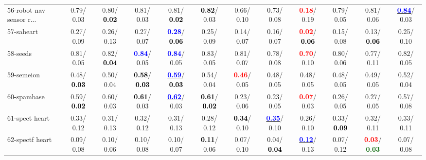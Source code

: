 \begin{table}[h]
\begin{center}
{\begin{tabular}{lc|c|c|c|c|c|c|c|c|c|c}
56-robot nav sensor r... &   0.79/  0.03 &   0.80/\textcolor{black}{\textbf{  0.02}} &   0.81/  0.03 &   0.81/\textcolor{black}{\textbf{  0.02}} & \textcolor{black}{\textbf{  0.82}}/  0.03 &   0.66/  0.10 &   0.73/  0.08 & \textcolor{red}{\textbf{  0.18}}/  0.19 &   0.79/  0.05 &   0.81/  0.06 & \underline{\textcolor{blue}{\textbf{  0.84}}}/  0.03 \\
57-saheart &   0.27/  0.09 &   0.26/  0.13 &   0.27/  0.07 & \textcolor{blue}{\textbf{  0.28}}/\textcolor{black}{\textbf{  0.06}} &   0.25/  0.09 &   0.14/  0.07 &   0.16/  0.07 & \textcolor{red}{\textbf{  0.02}}/\textcolor{black}{\textbf{  0.06}} &   0.15/  0.08 &   0.13/\textcolor{black}{\textbf{  0.06}} &   0.25/  0.10 \\
58-seeds &   0.81/  0.05 &   0.82/\textcolor{black}{\textbf{  0.04}} & \textcolor{blue}{\textbf{  0.84}}/  0.05 & \textcolor{blue}{\textbf{  0.84}}/  0.05 &   0.83/  0.05 &   0.81/  0.07 &   0.78/  0.08 & \textcolor{red}{\textbf{  0.70}}/  0.10 &   0.80/  0.06 &   0.77/  0.11 &   0.82/  0.05 \\
59-semeion &   0.48/\textcolor{black}{\textbf{  0.03}} &   0.50/  0.04 & \textcolor{black}{\textbf{  0.58}}/\textcolor{black}{\textbf{  0.03}} & \underline{\textcolor{blue}{\textbf{  0.59}}}/\textcolor{black}{\textbf{  0.03}} &   0.54/  0.04 & \textcolor{red}{\textbf{  0.46}}/  0.05 &   0.48/  0.05 &   0.48/  0.05 &   0.48/  0.05 &   0.49/  0.05 &   0.52/  0.04 \\
60-spambase &   0.59/\textcolor{black}{\textbf{  0.02}} &   0.60/  0.03 & \textcolor{black}{\textbf{  0.61}}/  0.03 & \underline{\textcolor{blue}{\textbf{  0.62}}}/  0.03 & \textcolor{black}{\textbf{  0.61}}/\textcolor{black}{\textbf{  0.02}} &   0.23/  0.06 &   0.23/  0.05 & \textcolor{red}{\textbf{  0.07}}/  0.03 &   0.26/  0.05 &   0.27/  0.05 &   0.57/  0.08 \\ \hline
61-spect heart &   0.33/  0.12 &   0.31/  0.13 &   0.32/  0.12 &   0.31/  0.13 &   0.28/  0.12 & \textcolor{black}{\textbf{  0.34}}/  0.10 & \underline{\textcolor{blue}{\textbf{  0.35}}}/  0.10 &   0.26/  0.10 &   0.33/\textcolor{black}{\textbf{  0.09}} &   0.32/  0.11 &   0.33/  0.11 \\
62-spectf heart &   0.09/  0.08 &   0.10/  0.06 &   0.10/  0.08 &   0.10/  0.07 & \textcolor{black}{\textbf{  0.11}}/  0.06 &   0.07/  0.10 &   0.04/\textcolor{black}{\textbf{  0.04}} & \underline{\textcolor{blue}{\textbf{  0.12}}}/  0.13 &   0.07/  0.12 & \textcolor{red}{\textbf{  0.03}}/\textcolor{darkgreen}{\textbf{  0.03}} &   0.07/  0.08 \\

\end{tabular}}
\end{center}
\end{table}
